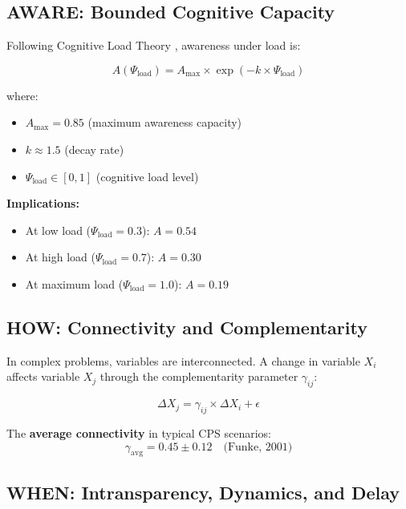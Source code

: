 \subsection{AWARE: Bounded Cognitive Capacity}
\label{sec:cps-aware}

Following Cognitive Load Theory \citep{PAP-sweller1988cognitiveload}, awareness under load is:

\begin{equation}
A(\Psi_{\text{load}}) = A_{\max} \times \exp(-k \times \Psi_{\text{load}})
\label{eq:awareness-load}
\end{equation}

where:
\begin{itemize}
\item $A_{\max} = 0.85$ (maximum awareness capacity)
\item $k \approx 1.5$ (decay rate)
\item $\Psi_{\text{load}} \in [0,1]$ (cognitive load level)
\end{itemize}

\textbf{Implications:}
\begin{itemize}
\item At low load ($\Psi_{\text{load}} = 0.3$): $A = 0.54$
\item At high load ($\Psi_{\text{load}} = 0.7$): $A = 0.30$
\item At maximum load ($\Psi_{\text{load}} = 1.0$): $A = 0.19$
\end{itemize}


\subsection{HOW: Connectivity and Complementarity}
\label{sec:cps-how}

In complex problems, variables are interconnected. A change in variable $X_i$ affects variable $X_j$ through the complementarity parameter $\gamma_{ij}$:

\begin{equation}
\Delta X_j = \gamma_{ij} \times \Delta X_i + \epsilon
\end{equation}

The \textbf{average connectivity} in typical CPS scenarios:
\begin{equation}
\gamma_{\text{avg}} = 0.45 \pm 0.12 \quad \text{(Funke, 2001)}
\end{equation}


\subsection{WHEN: Intransparency, Dynamics, and Delay}
\label{sec:cps-when}

